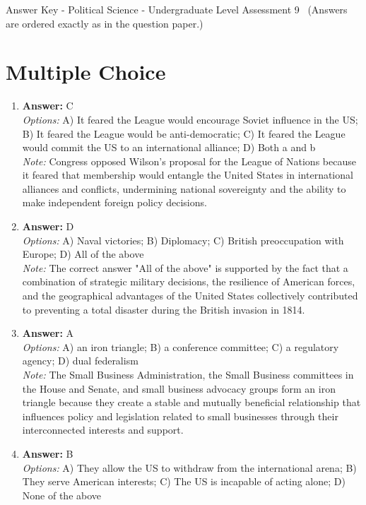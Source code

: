 \documentclass[12pt]{article}
\begin{document}
\begin{center}
Answer Key - Political Science - Undergraduate Level Assessment 9 \
\small (Answers are ordered exactly as in the question paper.)
\end{center}

\section*{Multiple Choice}
\begin{enumerate}[label=\arabic*.]
\item \textbf{Answer:} C
\\ \textit{Options:} A) It feared the League would encourage Soviet influence in the US; B) It feared the League would be anti-democratic; C) It feared the League would commit the US to an international alliance; D) Both a and b
\\ \textit{Note:} Congress opposed Wilson's proposal for the League of Nations because it feared that membership would entangle the United States in international alliances and conflicts, undermining national sovereignty and the ability to make independent foreign policy decisions.
\item \textbf{Answer:} D
\\ \textit{Options:} A) Naval victories; B) Diplomacy; C) British preoccupation with Europe; D) All of the above
\\ \textit{Note:} The correct answer "All of the above" is supported by the fact that a combination of strategic military decisions, the resilience of American forces, and the geographical advantages of the United States collectively contributed to preventing a total disaster during the British invasion in 1814.
\item \textbf{Answer:} A
\\ \textit{Options:} A) an iron triangle; B) a conference committee; C) a regulatory agency; D) dual federalism
\\ \textit{Note:} The Small Business Administration, the Small Business committees in the House and Senate, and small business advocacy groups form an iron triangle because they create a stable and mutually beneficial relationship that influences policy and legislation related to small businesses through their interconnected interests and support.
\item \textbf{Answer:} B
\\ \textit{Options:} A) They allow the US to withdraw from the international arena; B) They serve American interests; C) The US is incapable of acting alone; D) None of the above

\end{enumerate}
\end{document}
